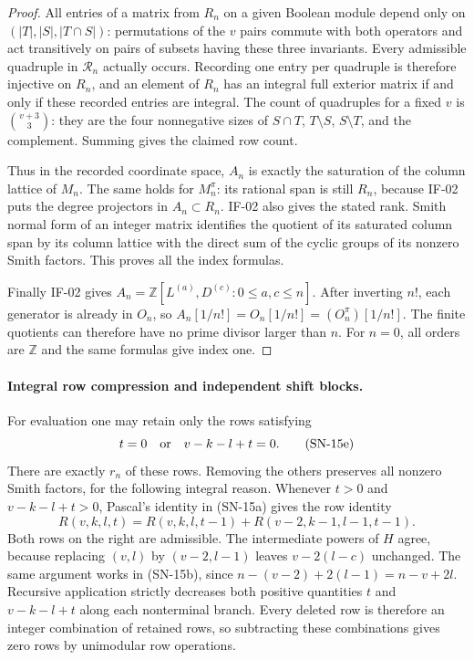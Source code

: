 \documentclass[11pt,a4paper]{article}
\theoremstyle{definition}
\theoremstyle{remark}
\begin{document}
\begin{proof}
All entries of a matrix from $R_n$ on a given Boolean module
depend only on $(|T|,|S|,|T\cap S|)$: permutations of the $v$
pairs commute with both operators and act transitively on pairs
of subsets having these three invariants. Every admissible
quadruple in $\mathcal R_n$ actually occurs. Recording one entry
per quadruple is therefore injective on $R_n$, and an element
of $R_n$ has an integral full exterior matrix if and only if
these recorded entries are integral. The count of quadruples
for a fixed $v$ is $\binom{v+3}{3}$: they are the four
nonnegative sizes of $S\cap T$, $T\setminus S$,
$S\setminus T$, and the complement. Summing gives the claimed
row count.

Thus in the recorded coordinate space, $A_n$ is exactly the
saturation of the column lattice of $M_n$. The same holds for
$M_n^\pi$: its rational span is still $R_n$, because IF-02
puts the degree projectors in $A_n\subset R_n$. IF-02 also
gives the stated rank. Smith normal form of an integer matrix
identifies the quotient of its saturated column span by its
column lattice with the direct sum of the cyclic groups of
its nonzero Smith factors. This proves all the index formulas.

Finally IF-02 gives
$A_n=\mathbb Z[L^{(a)},D^{(c)}:0\le a,c\le n]$.
After inverting $n!$, each generator is already in $O_n$,
so $A_n[1/n!]=O_n[1/n!]=(O_n^\pi)[1/n!]$.
The finite quotients can therefore have no prime divisor
larger than $n$. For $n=0$, all orders are $\mathbb Z$ and
the same formulas give index one.
\end{proof}

\paragraph{Integral row compression and independent shift blocks.}
For evaluation one may retain only the rows satisfying
\[
 t=0\quad\hbox{or}\quad v-k-l+t=0.                \tag{SN-15e}
\]
There are exactly $r_n$ of these rows. Removing the others preserves
all nonzero Smith factors, for the following integral reason.
Whenever $t>0$ and $v-k-l+t>0$, Pascal's identity in (SN-15a)
gives the row identity
\[
 R(v,k,l,t)=R(v,k,l,t-1)+R(v-2,k-1,l-1,t-1).      \tag{SN-15f}
\]
Both rows on the right are admissible. The intermediate powers of
$H$ agree, because replacing $(v,l)$ by $(v-2,l-1)$ leaves
$v-2(l-c)$ unchanged. The same argument works in (SN-15b), since
$n-(v-2)+2(l-1)=n-v+2l$. Recursive application strictly decreases
both positive quantities $t$ and $v-k-l+t$ along each nonterminal
branch. Every deleted row is therefore an integer combination of
retained rows, so subtracting these combinations gives zero rows
by unimodular row operations.
\end{document}
